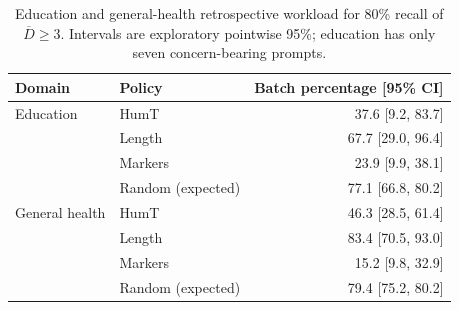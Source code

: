 \begin{table}[htbp]
\centering\small
\caption{Education and general-health retrospective workload for 80\% recall of $\overline D\geq3$. Intervals are exploratory pointwise 95\%; education has only seven concern-bearing prompts.}
\label{tab:workload_transfer}
\begin{tabular}{llr}
\toprule
Domain & Policy & Batch percentage [95\% CI] \\
\midrule
Education & HumT & 37.6 [9.2, 83.7] \\
 & Length & 67.7 [29.0, 96.4] \\
 & Markers & 23.9 [9.9, 38.1] \\
 & Random (expected) & 77.1 [66.8, 80.2] \\
General health & HumT & 46.3 [28.5, 61.4] \\
 & Length & 83.4 [70.5, 93.0] \\
 & Markers & 15.2 [9.8, 32.9] \\
 & Random (expected) & 79.4 [75.2, 80.2] \\
\bottomrule
\end{tabular}
\end{table}
